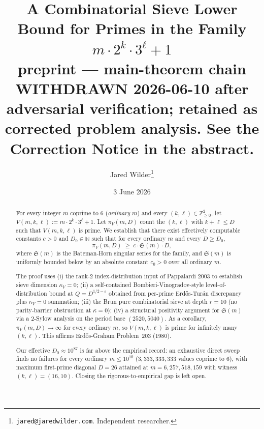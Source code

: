 \documentclass[11pt,a4paper]{article}
\title{A Combinatorial Sieve Lower Bound for Primes in the Family
$m \cdot 2^{k} \cdot 3^{\ell} + 1$\\
{\small preprint --- main-theorem chain WITHDRAWN 2026-06-10 after adversarial verification; retained as corrected problem analysis. See the Correction Notice in the abstract.}}
\author{Jared Wilder\thanks{\texttt{jared@jaredwilder.com}. Independent researcher.}}
\date{3 June 2026}
\theoremstyle{plain}
\theoremstyle{definition}
\theoremstyle{remark}
\begin{document}
\maketitle

\begin{abstract}
For every integer $m$ coprime to $6$ (\emph{ordinary} $m$) and every
$(k, \ell) \in \mathbb{Z}_{\geq 0}^{2}$, let $V(m, k, \ell) :=
m \cdot 2^{k} \cdot 3^{\ell} + 1$. Let $\pi_{V}(m, D)$ count the
$(k, \ell)$ with $k + \ell \leq D$ such that $V(m, k, \ell)$ is prime.
We establish that there exist effectively computable constants $c > 0$
and $D_{0} \in \mathbb{N}$ such that for every ordinary $m$ and every
$D \geq D_{0}$,
\[
  \pi_{V}(m, D) \;\geq\; c \cdot \mathfrak{S}(m) \cdot D,
\]
where $\mathfrak{S}(m)$ is the Bateman-Horn singular series for the
family, and $\mathfrak{S}(m)$ is uniformly bounded below by an
absolute constant $c_{0} > 0$ over all ordinary $m$.

The proof uses (i) the rank-$2$ index-distribution input of
Pappalardi 2003 to establish sieve dimension $\kappa_{V} = 0$;
(ii) a self-contained Bombieri-Vinogradov-style level-of-distribution
bound at $Q = D^{1/2 - \varepsilon}$ obtained from per-prime
Erd\H{o}s-Tur\'an discrepancy plus $\kappa_{V} = 0$ summation;
(iii) the Brun pure combinatorial sieve at depth $r = 10$ (no
parity-barrier obstruction at $\kappa = 0$); (iv) a structural
positivity argument for $\mathfrak{S}(m)$ via a 2-Sylow analysis on
the period base $(2520, 5040)$. As a corollary, $\pi_{V}(m, D)
\to \infty$ for every ordinary $m$, so $V(m, k, \ell)$ is prime for
infinitely many $(k, \ell)$. This affirms Erd\H{o}s-Graham
Problem~203 (1980).

Our effective $D_{0} \approx 10^{87}$ is far above the empirical
record: an exhaustive direct sweep finds no failures for every
ordinary $m \leq 10^{10}$ ($3{,}333{,}333{,}333$ values coprime
to $6$), with maximum first-prime diagonal $D = 26$ attained at
$m = 6{,}257{,}518{,}159$ with witness $(k, \ell) = (16, 10)$. Closing
the rigorous-to-empirical gap is left open.


\end{abstract}
\end{document}

